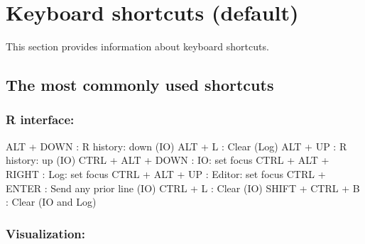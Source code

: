 
\hypertarget{basic_card}{}
\section{Keyboard shortcuts (default)}

This section provides information about keyboard shortcuts.

\hypertarget{basic_card_mostused}{}
\subsection{The most commonly used shortcuts}


\subsubsection{R interface:}

\vspace{-0.5cm}
\begin{Rtables}[caption={[R interface keyboard shortcuts]
    R interface keyboard shortcuts},
  label=hotkey:rinterface]
  ALT   + DOWN            : R history: down (IO)
  ALT   + L               : Clear (Log)
  ALT   + UP              : R history: up (IO)
  CTRL  + ALT + DOWN      : IO: set focus
  CTRL  + ALT + RIGHT     : Log: set focus
  CTRL  + ALT + UP        : Editor: set focus
  CTRL  + ENTER           : Send any prior line (IO)
  CTRL  + L               : Clear (IO)
  SHIFT + CTRL + B        : Clear (IO and Log)
\end{Rtables}


\subsubsection{Visualization:}

